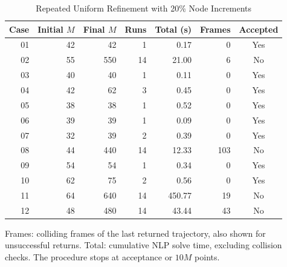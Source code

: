 \begin{table}[t]
\caption{Repeated Uniform Refinement with 20\% Node Increments}\label{tab:refinement}
\centering\footnotesize
\begin{tabular}{@{}rrrrrrc@{}}\toprule
Case&Initial $M$&Final $M$&Runs&Total (s)&Frames&Accepted\\\midrule
01&42&42&1&0.17&0&Yes\\
02&55&550&14&21.00&6&No\\
03&40&40&1&0.11&0&Yes\\
04&42&62&3&0.45&0&Yes\\
05&38&38&1&0.52&0&Yes\\
06&39&39&1&0.09&0&Yes\\
07&32&39&2&0.39&0&Yes\\
08&44&440&14&12.33&103&No\\
09&54&54&1&0.34&0&Yes\\
10&62&75&2&0.56&0&Yes\\
11&64&640&14&450.77&19&No\\
12&48&480&14&43.44&43&No\\
\bottomrule\end{tabular}
\par\smallskip\parbox{\columnwidth}{\footnotesize Frames: colliding frames of the last returned trajectory, also shown for unsuccessful returns. Total: cumulative NLP solve time, excluding collision checks. The procedure stops at acceptance or $10M$ points.}
\end{table}